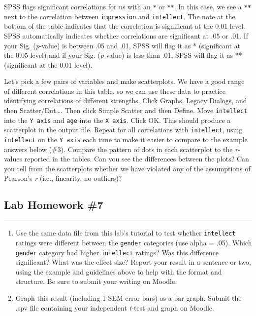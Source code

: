 \documentclass[
]{book}
\begin{document}
SPSS flags significant correlations for us with an \texttt{*} or \texttt{**}. In this case, we see a \texttt{**} next to the correlation between \texttt{impression} and \texttt{intellect}. The note at the bottom of the table indicates that the correlation is significant at the 0.01 level. SPSS automatically indicates whether correlations are significant at .05 or .01. If your Sig. (\emph{p}-value) is between .05 and .01, SPSS will flag it as * (significant at the 0.05 level) and if your Sig. (\emph{p}-value) is less than .01, SPSS will flag it as ** (significant at the 0.01 level).

Let's pick a few pairs of variables and make scatterplots. We have a good range of different correlations in this table, so we can use these data to practice identifying correlations of different strengths. Click {Graphs}, {Legacy Dialogs}, and then {Scatter/Dot\ldots{}}. Then click {Simple Scatter} and then {Define}. Move \texttt{intellect} into the \texttt{Y\ axis} and \texttt{age} into the \texttt{X\ axis}. Click {OK}. This should produce a scatterplot in the output file. Repeat for all correlations with \texttt{intellect}, using \texttt{intellect} on the \texttt{Y\ axis} each time to make it easier to compare to the example answers below (\#3). Compare the pattern of dots in each scatterplot to the \emph{r}-values reported in the tables. Can you see the differences between the plots? Can you tell from the scatterplots whether we have violated any of the assumptions of Pearson's \emph{r} (i.e., linearity, no outliers)?

\hypertarget{lab-homework-7}{%
\subsection{Lab Homework \#7}\label{lab-homework-7}}

\begin{center}\rule{0.5\linewidth}{0.5pt}\end{center}

\begin{enumerate}
\def\labelenumi{\arabic{enumi}.}
\item
  Use the same data file from this lab's tutorial to test whether \texttt{intellect} ratings were different between the \texttt{gender} categories (use alpha = .05). Which \texttt{gender} category had higher \texttt{intellect} ratings? Was this difference significant? What was the effect size? Report your result in a sentence or two, using the example and guidelines above to help with the format and structure. Be sure to submit your writing on Moodle.
\item
  Graph this result (including 1 SEM error bars) as a bar graph. Submit the .spv file containing your independent \emph{t}-test and graph on Moodle.
\end{enumerate}
\end{document}

